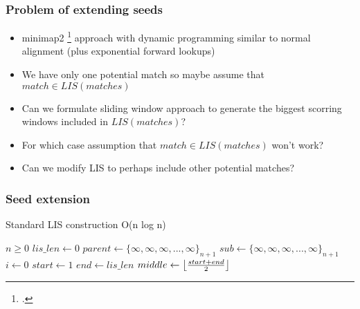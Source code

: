 \begin{frame}
  \frametitle{Problem of extending seeds}

  \begin{itemize}
    \item minimap2 \footcite{minimap2} approach with dynamic programming similar to normal alignment (plus exponential forward lookups)
    \item We have only one potential match so maybe assume that $match \in LIS(matches)$
    \item Can we formulate sliding window approach to generate the biggest scorring windows included in $LIS(matches)$?
    \item For which case assumption that $match \in LIS(matches)$ won't work?
    \item Can we modify LIS to perhaps include other potential matches?
  \end{itemize}
\end{frame}

\begin{frame}
  \frametitle{Seed extension}
  
  \begin{algorithm}[H]
      \captionsetup{font=scriptsize}
      \caption{Standard LIS construction O(n log n)}\label{alg:cap}
      \scriptsize
      \begin{algorithmic}
          \Require $n \geq 0$
          \State $lis\_len \gets 0$ 
          \State $parent \gets \{\infty, \infty, \infty, ..., \infty\}_{n+1}$ 
          \State $sub \gets \{\infty, \infty, \infty, ..., \infty\}_{n+1}$ 
          \State $i \gets 0$
           
              \State $start \gets 1$
              \State $end \gets lis\_len$
               
                  \State $middle \gets \floor*{\frac{start + end}{2}}$
                  \Else
                  \EndIf
              \EndWhile
               
              \EndIf
          \EndWhile
      \end{algorithmic}
  \end{algorithm}
\end{frame}

